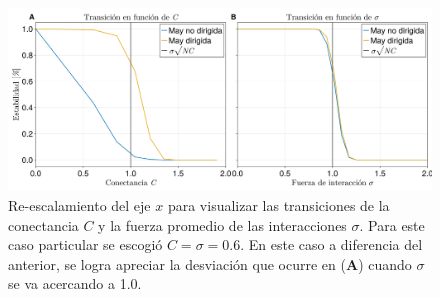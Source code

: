 \begin{figure}[h!]
	\centering
	\includegraphics[scale=0.160]{../Imagenes/Transicionσ√NC06}
	\caption{Re-escalamiento del eje $x$ para visualizar las transiciones de la conectancia $C$ y la fuerza promedio de las interacciones $\sigma$. Para este caso particular se escogió $C=\sigma=0.6$. En este caso a diferencia del anterior, se logra apreciar la desviación que ocurre en (\textbf{A}) cuando $\sigma$ se va acercando a 1.0.}
	\label{fig:Transicionσ√NC06}
\end{figure}






